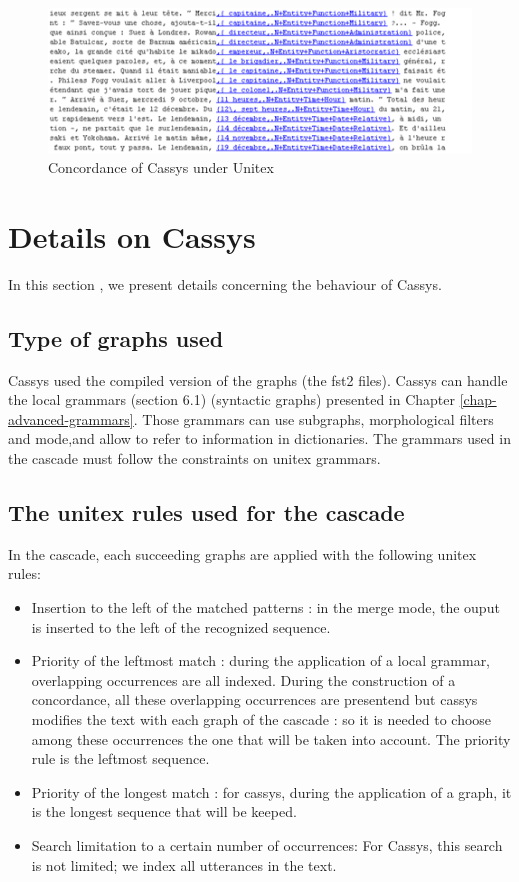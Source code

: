 \begin{figure}[!htb]
  \centering
  \includegraphics[width=14cm]{resources/img/fig13-04.png}
  \caption{Concordance of Cassys under Unitex}
  \label{fig:fig13-04}
\end{figure}

\section{Details on Cassys}

In this section , we present details concerning the behaviour of Cassys.

\subsection{Type of graphs used}

Cassys used the compiled version of the graphs (the fst2 files).
Cassys can handle the local grammars (section 6.1) (syntactic graphs) presented in Chapter \ref{chap-advanced-grammars}. Those grammars can use subgraphs, 
morphological filters and mode,and allow to refer to information in dictionaries. 
The grammars used in the cascade must follow the constraints on unitex grammars.

\subsection{The unitex rules used for the cascade}

In the cascade, each succeeding graphs are applied with the following unitex rules:
\begin{itemize}
	\item Insertion to the left of the matched patterns : in the merge mode, the ouput is inserted to the left of the recognized sequence.
	\item	Priority of the leftmost match : during the application of a local grammar, overlapping occurrences are all indexed. 
	During the construction of a concordance, all these overlapping occurrences are presentend but cassys modifies the text with each 
	graph of the cascade : so it is needed to choose among these occurrences the one that will be taken into account. The priority rule 
	is the leftmost sequence.
	\item Priority of the longest match : for cassys, during the application of a graph, it is the longest sequence 
	that will be keeped.
	\item	Search limitation to a certain number of occurrences: For Cassys, this search is not limited; we index all utterances in the text.
\end{itemize}


